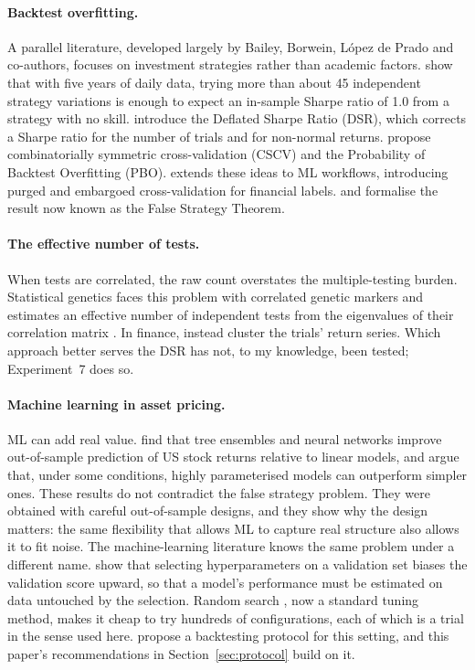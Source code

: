 \documentclass[11pt]{article}
\begin{document}
\paragraph{Backtest overfitting.}
A parallel literature, developed largely by Bailey, Borwein, L\'opez de Prado and co-authors, focuses on investment strategies rather than academic factors. \citet{bailey2014pseudo} show that with five years of daily data, trying more than about 45 independent strategy variations is enough to expect an in-sample Sharpe ratio of 1.0 from a strategy with no skill. \citet{bailey2014dsr} introduce the Deflated Sharpe Ratio (DSR), which corrects a Sharpe ratio for the number of trials and for non-normal returns. \citet{bailey2017pbo} propose combinatorially symmetric cross-validation (CSCV) and the Probability of Backtest Overfitting (PBO). \citet{lopezdeprado2018} extends these ideas to ML workflows, introducing purged and embargoed cross-validation for financial labels. \citet{lopezdeprado2019lewis} and \citet{lopezdeprado2021fst} formalise the result now known as the False Strategy Theorem.

\paragraph{The effective number of tests.}
When tests are correlated, the raw count overstates the multiple-testing burden. Statistical genetics faces this problem with correlated genetic markers and estimates an effective number of independent tests from the eigenvalues of their correlation matrix \citep{liji2005}. In finance, \citet{lopezdeprado2019lewis} instead cluster the trials' return series. Which approach better serves the DSR has not, to my knowledge, been tested; Experiment~7 does so.

\paragraph{Machine learning in asset pricing.}
ML can add real value. \citet{gu2020} find that tree ensembles and neural networks improve out-of-sample prediction of US stock returns relative to linear models, and \citet{kelly2024} argue that, under some conditions, highly parameterised models can outperform simpler ones. These results do not contradict the false strategy problem. They were obtained with careful out-of-sample designs, and they show why the design matters: the same flexibility that allows ML to capture real structure also allows it to fit noise. The machine-learning literature knows the same problem under a different name. \citet{cawley2010} show that selecting hyperparameters on a validation set biases the validation score upward, so that a model's performance must be estimated on data untouched by the selection. Random search \citep{bergstra2012}, now a standard tuning method, makes it cheap to try hundreds of configurations, each of which is a trial in the sense used here. \citet{arnott2019} propose a backtesting protocol for this setting, and this paper's recommendations in Section~\ref{sec:protocol} build on it.
\end{document}
